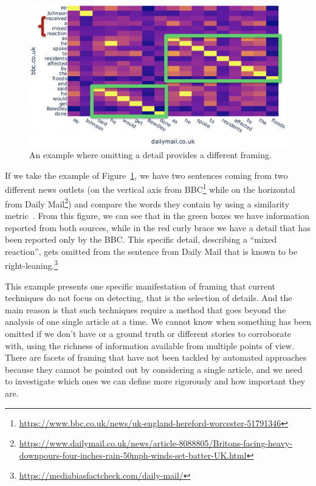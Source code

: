 \begin{figure}[!htb]
    \centering
    \includegraphics[width=\linewidth]{figures/johnson_flood.png}
    \caption{An example where omitting a detail provides a different framing.}
    \label{fig:johnson_flood}
\end{figure}

If we take the example of Figure~\ref{fig:johnson_flood}, we have two sentences coming from two different news outlets (on the vertical axis from BBC\footnote{\url{https://www.bbc.co.uk/news/uk-england-hereford-worcester-51791346}} while on the horizontal from Daily Mail\footnote{\url{https://www.dailymail.co.uk/news/article-8088805/Britons-facing-heavy-downpours-four-inches-rain-50mph-winds-set-batter-UK.html}}) and compare the words they contain by using a similarity metric~\cite{cer2018universal}.
From this figure, we can see that in the green boxes we have information reported from both sources, while in the red curly brace we have a detail that has been reported only by the BBC.
This specific detail, describing a ``mixed reaction'', gets omitted from the sentence from Daily Mail that is known to be right-leaning.\footnote{\url{https://mediabiasfactcheck.com/daily-mail/}}

This example presents one specific manifestation of framing that current techniques do not focus on detecting, that is the selection of details.
And the main reason is that such techniques require a method that goes beyond the analysis of one single article at a time.
We cannot know when something has been omitted if we don't have or a ground truth or different stories to corroborate with, using the richness of information available from multiple points of view.
There are facets of framing that have not been tackled by automated approaches because they cannot be pointed out by considering a single article, and we need to investigate which ones we can define more rigorously and how important they are.

